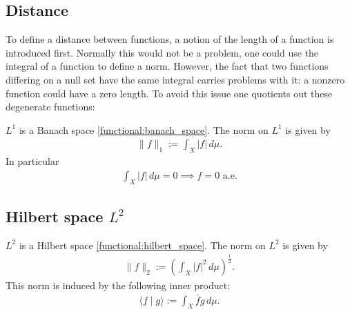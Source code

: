 \subsection{Distance}

    To define a distance between functions, a notion of the length of a function is introduced first. Normally this would not be a problem, one could use the integral of a function to define a norm. However, the fact that two functions differing on a null set have the same integral carries problems with it: a nonzero function could have a zero length. To avoid this issue one quotients out these degenerate functions:
    \begin{property}
        $L^1$ is a Banach space \ref{functional:banach_space}. The norm on $L^1$ is given by
        \begin{gather}
            \label{lebesgue:L1_norm}
            \|f\|_1 := \int_X|f|\,d\mu.
        \end{gather}
        In particular
        \begin{gather}
            \int_X|f|\,d\mu=0\implies f=0\text{ a.e.}
        \end{gather}
    \end{property}

\subsection{Hilbert space \texorpdfstring{$L^2$}{L2}}\label{section:hilbert_space}

    \begin{property}\label{lebesgue:L2_hilbert_space}
        $L^2$ is a Hilbert space \ref{functional:hilbert_space}. The norm on $L^2$ is given by
        \begin{gather}
            \label{lebesgue:L2_norm}
            \|f\|_2 := \left(\int_X|f|^2\,d\mu\right)^{\frac{1}{2}}.
        \end{gather}
        This norm is induced by the following inner product:
        \begin{gather}
            \label{lebesgue:L2_inner_product}
            \langle f\mid g \rangle := \int_X\overline{f}g\,d\mu.
        \end{gather}
    \end{property}

